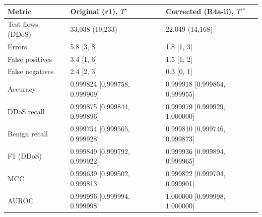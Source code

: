 \begin{tabular}{@{}lll@{}}
\toprule
Metric & Original (r1), $T^\star$ & Corrected (R4a-ii), $T'^\star$ \\
\midrule
Test flows (DDoS) & 33,038 (19,233) & 22,049 (14,168) \\
Errors & 5.8 [3, 8] & 1.8 [1, 3] \\
False positives & 3.4 [1, 6] & 1.5 [1, 2] \\
False negatives & 2.4 [2, 3] & 0.3 [0, 1] \\
Accuracy & 0.999824 [0.999758, 0.999909] & 0.999918 [0.999864, 0.999955] \\
DDoS recall & 0.999875 [0.999844, 0.999896] & 0.999979 [0.999929, 1.000000] \\
Benign recall & 0.999754 [0.999565, 0.999928] & 0.999810 [0.999746, 0.999873] \\
F1 (DDoS) & 0.999849 [0.999792, 0.999922] & 0.999936 [0.999894, 0.999965] \\
MCC & 0.999639 [0.999502, 0.999813] & 0.999822 [0.999704, 0.999901] \\
AUROC & 0.999996 [0.999994, 0.999998] & 1.000000 [0.999998, 1.000000] \\
\bottomrule
\end{tabular}
